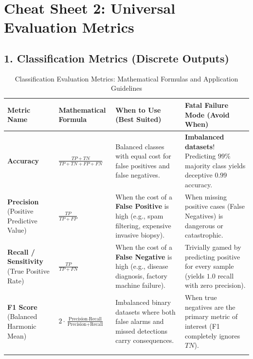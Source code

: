 \section{Cheat Sheet 2: Universal Evaluation Metrics}\label{sec:cs_metrics}

\subsection*{1. Classification Metrics (Discrete Outputs)}

\begin{table}[htbp]
\centering
\scriptsize
\caption{Classification Evaluation Metrics: Mathematical Formulas and Application Guidelines}\label{tab:metrics_classification}
\begin{tabular}{@{}p{2.8cm}p{4.2cm}p{4.2cm}p{3.2cm}@{}}
\toprule
\textbf{Metric Name} & \textbf{Mathematical Formula} & \textbf{When to Use (Best Suited)} & \textbf{Fatal Failure Mode (Avoid When)} \\ \midrule
\textbf{Accuracy} & 
$\frac{TP + TN}{TP + TN + FP + FN}$ & 
Balanced classes with equal cost for false positives and false negatives. & 
\textbf{Imbalanced datasets}! Predicting $99\%$ majority class yields deceptive $0.99$ accuracy. \\ \addlinespace

\textbf{Precision} (Positive Predictive Value) & 
$\frac{TP}{TP + FP}$ & 
When the cost of a \textbf{False Positive} is high (e.g., spam filtering, expensive invasive biopsy). & 
When missing positive cases (False Negatives) is dangerous or catastrophic. \\ \addlinespace

\textbf{Recall / Sensitivity} (True Positive Rate) & 
$\frac{TP}{TP + FN}$ & 
When the cost of a \textbf{False Negative} is high (e.g., disease diagnosis, factory machine failure). & 
Trivially gamed by predicting positive for every sample (yields $1.0$ recall with zero precision). \\ \addlinespace

\textbf{F1 Score} (Balanced Harmonic Mean) & 
$2 \cdot \frac{\text{Precision} \cdot \text{Recall}}{\text{Precision} + \text{Recall}}$ & 
Imbalanced binary datasets where both false alarms and missed detections carry consequences. & 
When true negatives are the primary metric of interest (F1 completely ignores $TN$). \\ \addlinespace


\end{tabular}
\end{table}
